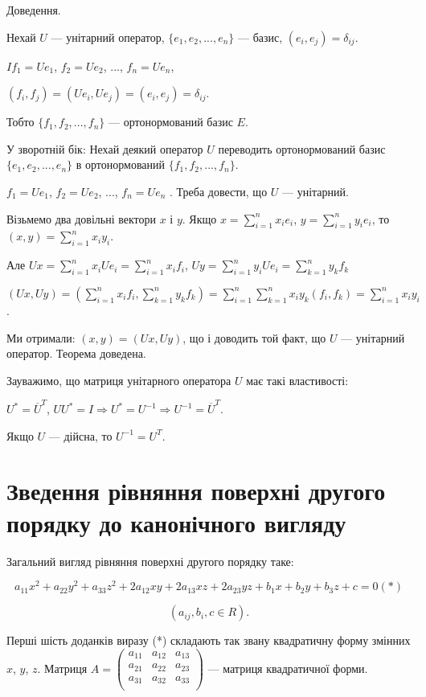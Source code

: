 Доведення.

Нехай $U$ --- унітарний оператор, $\{e_1, e_2, ..., e_n\}$ --- базис, $(e_i, e_j) = \delta_{ij}$.

$I f_1 = U e_1$, $f_2 = U e_2$, ..., $f_n = U e_n$,

$(f_i, f_j) = (U e_i, U e_j) = (e_i, e_j) = \delta_{ij}$.

Тобто $\{f_1, f_2, ..., f_n\}$ --- ортонормований базис $E$.

У зворотній бік: Нехай деякий оператор $U$ переводить
ортонормований базис $\{e_1, e_2, ..., e_n\}$ в ортонормований $\{f_1, f_2, ..., f_n\}$.

$f_1 = U e_1$, $f_2 = U e_2$, ..., $f_n = U e_n$ . Треба довести, що $U$ --- унітарний.

Візьмемо два довільні вектори $x$ і $y$. Якщо $x = \sum\limits_{i=1}^n x_i e_i$,
$y = \sum\limits_{i=1}^n y_i e_i$, то $(x,y) = \sum\limits_{i=1}^n x_i y_i$.

Але $U x = \sum\limits_{i=1}^n x_i U e_i = \sum\limits_{i=1}^n x_i f_i$,
$U y = \sum\limits_{i=1}^n y_i U e_i = \sum\limits_{k=1}^n y_k f_k$

$(U x, U y)
= \left( \sum\limits_{i=1}^n x_i f_i, \sum\limits_{k=1}^n y_k f_k \right)
= \sum\limits_{i=1}^n \sum\limits_{k=1}^n x_i y_k(f_i, f_k)
= \sum\limits_{i=1}^n x_i y_i$.

Ми отримали: $(x, y) = (U x, U y)$, що і доводить той факт, що $U$ --- унітарний
оператор. Теорема доведена.


Зауважимо, що матриця унітарного оператора $U$ має такі властивості:

$U^* = \overline{U}^T$, $U U^* = I \Rightarrow U^* = U^{-1} \Rightarrow U^{-1} = \overline{U}^T$. 

Якщо $U$ --- дійсна, то $U^{-1} = U^T$.

\section{Зведення рівняння поверхні другого порядку до канонічного вигляду}  %

Загальний вигляд рівняння поверхні другого порядку таке: 

$$a_{11} x^2 + a_{22} y^2 + a_{33} z^2 + 2 a_{12} x y + 2 a_{13} xz + 2 a_{23} yz + b_1 x + b_2 y + b_3 z + c = 0 (*)$$

$$(a_{ij}, b_i, c \in R).$$

Перші шість доданків виразу (*) складають так звану квадратичну форму
змінних $x$, $y$, $z$. Матриця $A = \begin{pmatrix}
	a_{11} & a_{12} & a_{13} \\
	a_{21} & a_{22} & a_{23} \\
	a_{31} & a_{32} & a_{33} \\
\end{pmatrix}$ --- матриця квадратичної форми.

